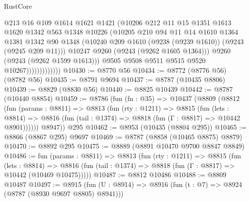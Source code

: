 \begin{lexlean}{RustCore}
\begin{coremodule}
                              @213
                              @16
                              @109
                              @1614
                              @1621
                              @1421
                              (@10206
                                @212
                                @11
                                @15
                                @1351
                                @1613
                                @1620
                                @1342
                                @563
                                @1348
                                @10226
                                (@10205
                                  @210
                                  @94
                                  @11
                                  @14
                                  @1610
                                  @1364
                                  @1381
                                  @1342
                                  @90
                                  @1348
                                  (@10240 @209 @1610 (@9238 (@9239 @1610)) (@9243 (@9245 @209 @11)))
                                  @10247
                                  @9260
                                  (@9243 (@9262 @1605 @1364)))
                                @9260
                                (@9243 (@9262 @1599 @1613)))
                              @9505
                              @9508
                              @9511
                              @9515
                              @9520
                              @10267)))))))))))))
@10430 := @8770 @56
@10434 := @8772 (@8776 @56) (@8782 @56)
@10435 := @8791 @9694
@10437 := @8787 (@10435 @8806)
@10439 := @8829 (@8830 @56)
@10440 := @8825 @10439
@10442 := @8787 (@10440 @8854)
@10459 := @8786
    (fun (fn : @35) =>
    @10437
      (@8809
        (@8812
          (fun (params : @8811) =>
          @8813
            (fun (rty : @1211) =>
            @8815
              (fun (lets : @8814) =>
              @8816 (fun (tail : @1374) => @8818 (fun (Γ : @8817) => @10442 @8901))))))
        @8947))
    @295
@10462 := @8953 (@10435 (@8804 @295))
@10465 := @8866 (@8867 @295) @9697
@10469 := @8787 (@8858 (@10465 @8875) @8879)
@10470 := @8892 @295
@10475 := @8889 (@8891 @10470 @9700 @8847 @8849)
@10486 := fun (params : @8811) =>
  @8813
    (fun (rty : @1211) =>
    @8815
      (fun (lets : @8814) =>
      @8816 (fun (tail : @1374) => @8818 (fun (Γ : @8817) => @10442 (@10469 @10475)))))
@10487 := @8812 @10486
@10488 := @8809 @10487
@10497 := @8915 (fun (U : @8914) => @8916 (fun (t : @7) => @8924 (@8787 (@8930 @9697 @8805) @8941)))

\end{coremodule}
\end{lexlean}
